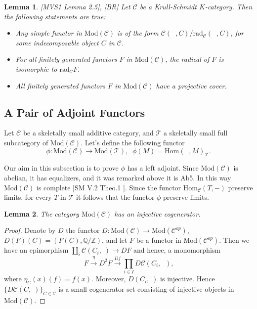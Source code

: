 \documentclass{amsart}
\theoremstyle{plain}
\newtheorem{lemma}{Lemma}
\numberwithin{equation}{section}
\begin{document}
\begin{lemma}
\label{cap1.22} \emph{[MVS1 Lemma 2.5], [BR]} Let $\mathcal{C}$ be a
Krull-Schmidt $K$-category. Then the following statements are true:

\begin{itemize}
\item[(a)] Any simple functor in $\mathrm{Mod}(\mathcal{C})$ is of the form $\mathcal{C}(\;\;,C)/\mathrm{rad}_{\mathcal{C}}(\;\;,C)$, for some
indecomposable object $C$ in $\mathcal{C}$.

\item[(b)] For all finitely generated functors $F$ in $\mathrm{Mod}(\mathcal{C})$, the radical of $F$ is isomorphic to $\mathrm{rad}_{\mathcal{C}}F.$

\item[(c)] All finitely generated functors $F$ in $\mathrm{Mod}(\mathcal{C})$
have a projective cover.
\end{itemize}
\end{lemma}

\subsection{A Pair of Adjoint Functors}

Let $\mathcal{C}$ be a skeletally small additive category, and $\mathcal{T}$
a skeletally small full subcategory of $\mathrm{Mod}(\mathcal{C})$. Let's
define the following functor
\begin{equation*}
\phi :\mathrm{Mod}(\mathcal{C})\rightarrow \mathrm{Mod}(\mathcal{T}),\;\;\phi (M)=\mathrm{Hom}(\;\;,M)_{\mathcal{T}}.
\end{equation*}

Our aim in this subsection is to prove $\phi $ has a left adjoint. Since $\mathrm{Mod}(\mathcal{C})$ is abelian, it has equalizers, and it was
remarked above it is Ab5. In this way $\mathrm{\mathrm{Mod}}(\mathcal{C})$
is complete [SM V.2 Theo.1 ]. Since the functor $\mathrm{Hom}_\mathcal{C}(T,-)$ preserve limits, for every $T $ in $\mathcal{T}$ it follows that the
functor $\phi $ preserve limits.

\begin{lemma}
The category $\mathrm{Mod}(\mathcal{C})$ has an injective cogenerator.
\end{lemma}

\begin{proof}
Denote by $D$ the functor $D:\mathrm{Mod}(\mathcal{C})\rightarrow \mathrm{Mod}(\mathcal{C}^{op})$, $D(F)(C)=(F(C),\mathbb{Q/Z})$, and let $F$ be a
functor in $\mathrm{Mod}(\mathcal{C}^{op})$. Then we have an epimorphism $\coprod_{i}\mathcal{C}(C_{i},\;)\rightarrow DF$ and hence, a monomorphism
\begin{equation*}
F\xrightarrow{\eta}D^{2}F\xrightarrow{Df}\prod_{i\in I}D\mathcal{C}(C_{i},\;\;)\text{,}
\end{equation*}where $\eta _{C}(x)(f)=f(x)$. Moreover, $D(C_{i},\;)$ is injective. Hence $\{D\mathcal{C}(C,\;)\}_{C\in \mathcal{C}}$ is a small cogenerator set
consisting of injective objects in $\mathrm{Mod}(\mathcal{C})$.
\end{proof}
\end{document}
